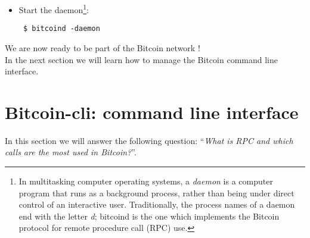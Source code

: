 \begin{itemize}
\bigskip
\noindent
First, create the directory you want to put your data into: \bigskip
\begin{lstlisting}
 $ /bin/mkdir ~username/.bitcoin
\end{lstlisting}
Then create the configuration file (as you need it):
\bigskip
\begin{lstlisting}
 $ cat >> ~username/.bitcoin/bitcoin.conf << EOF
 # Accept command line and JSON-RPC commands
 server=1
 # Username for JSON-RPC connections
 rpcuser=invent_a_username_here
 # Password for JSON-RPC connections
 rpcpassword=invent_a_long_pwd_here
 # Enable Testnet chain mode
 testnet=1
 EOF
\end{lstlisting}
The \textit{bitcoin.conf} file is the default file which Bitcoin daemon reads when launched, and it contains instructions to configure the node (e.g. mainnet, testnet or regtest mode). In this example we define a \textit{rpcuser} and \textit{rpcpassword} to enable RPC, and we tell the node to synchronize with the Bitcoin Testnet chain. (metti una nota qui per il sito dei conf file).

\bigskip
\noindent
Finally, limit the permissions to your configuration file (not really needed, but more secure): \bigskip
\begin{lstlisting}
 $ /bin/chmod 600 ~username/.bitcoin/bitcoin.conf
\end{lstlisting}
\item Start the daemon\footnote{In multitasking computer operating systems, a \textit{daemon} is a computer program that runs as a background process, rather than being under direct control of an interactive user. Traditionally, the process names of a daemon end with the letter \textit{d}; \colorbox{Grey!10}{bitcoind} is the one which implements the Bitcoin protocol for remote procedure call (RPC) use.}:
\bigskip
\begin{lstlisting}
 $ bitcoind -daemon
\end{lstlisting}
\end{itemize}
We are now ready to be part of the Bitcoin network ! \\ 
In the next section we will learn how to manage the Bitcoin command line interface.

\bigskip

\section{Bitcoin-cli: command line interface}
In this section we will answer the following question: \enquote{\textit{What is RPC and which calls are the most used in Bitcoin?}}.

